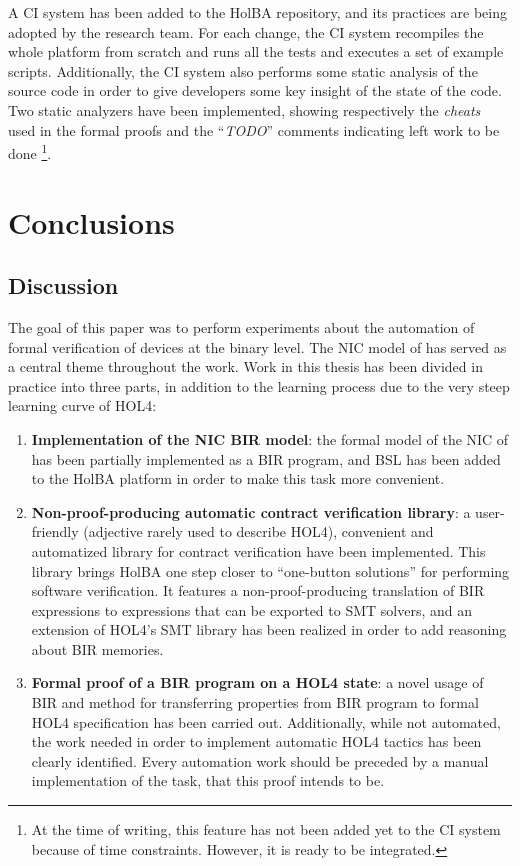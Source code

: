 \documentclass{kththesis}
\begin{document}
{A CI system has been added to the HolBA repository, and its practices are being adopted by the research team. For each change, the CI system recompiles the whole platform from scratch and runs all the tests and executes a set of example scripts. Additionally, the CI system also performs some static analysis of the source code in order to give developers some key insight of the state of the code. Two static analyzers have been implemented, showing respectively the \textit{cheats} used in the formal proofs and the ``\textit{TODO}'' comments indicating left work to be done \footnote{At the time of writing, this feature has not been added yet to the CI system because of time constraints. However, it is ready to be integrated.}.

\chapter{Conclusions}

\section{Discussion}

The goal of this paper was to perform experiments about the automation of formal verification of devices at the binary level. The NIC model of \cite{haglund_formal_2016} has served as a central theme throughout the work. Work in this thesis has been divided in practice into three parts, in addition to the learning process due to the very steep learning curve of HOL4:

\begin{enumerate}
    \item \textbf{Implementation of the NIC BIR model}: the formal model of the NIC of \cite{haglund_formal_2016} has been partially implemented as a BIR program, and BSL has been added to the HolBA platform in order to make this task more convenient.
    \item \textbf{Non-proof-producing automatic contract verification library}: a user-friendly (adjective rarely used to describe HOL4), convenient and automatized library for contract verification have been implemented. This library brings HolBA one step closer to ``one-button solutions'' for performing software verification. It features a non-proof-producing translation of BIR expressions to expressions that can be exported to SMT solvers, and an extension of HOL4's SMT library has been realized in order to add reasoning about BIR memories.
    \item \textbf{Formal proof of a BIR program on a HOL4 state}: a novel usage of BIR and method for transferring properties from BIR program to formal HOL4 specification has been carried out. Additionally, while not automated, the work needed in order to implement automatic HOL4 tactics has been clearly identified. Every automation work should be preceded by a manual implementation of the task, that this proof intends to be.
\end{enumerate}

}
\end{document}
